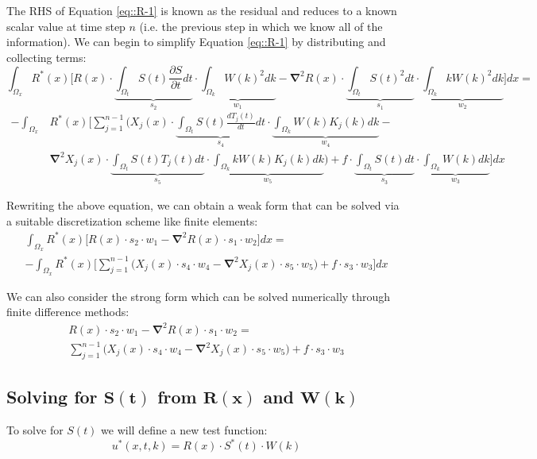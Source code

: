 \documentclass{article}
\def\ds{\displaystyle}
\def\pd{\partial}
\def\grad{\mathbf\nabla}
\begin{document}
The RHS of Equation \ref{eq::R-1} is known as the residual and reduces to a known scalar value at time step $n$ (i.e. the previous step in which we know all of the information). We can begin to simplify Equation \ref{eq::R-1} by distributing and collecting terms:
\begin{equation*}
\ds\int_{\Omega_x} R^*(x) \Bigg[ R(x)\cdot \underbrace{\ds\int_{\Omega_t} S(t)\frac{\pd S}{\pd t}dt}_{s_2} \cdot \underbrace{\ds\int_{\Omega_k} W(k)^2 dk}_{w_1} - \grad^2 R(x) \cdot \underbrace{\ds\int_{\Omega_t} S(t)^2 dt}_{s_1} \cdot \underbrace{\ds\int_{\Omega_k} kW(k)^2 dk}_{w_2} \Bigg] dx =
\end{equation*}\vspace{-15pt}
\begin{align}
-\ds\int_{\Omega_x}& R^*(x) \Bigg[ \ds\sum_{j=1}^{n-1} \bigg(X_j(x) \cdot \underbrace{\ds\int_{\Omega_t} S(t)\frac{dT_j(t)}{dt} dt}_{s_4} \cdot \underbrace{\ds\int_{\Omega_k}W(k)K_j(k) dk}_{w_4} - \nonumber \\
& \grad^2X_j(x) \cdot \underbrace{\ds\int_{\Omega_t}S(t)T_j(t) dt}_{s_5} \cdot \underbrace{\ds\int_{\Omega_k}kW(k)K_j(k)dk}_{w_5} \bigg) + f \cdot \underbrace{\ds\int_{\Omega_t} S(t) dt}_{s_3} \cdot \underbrace{\ds\int_{\Omega_k} W(k)dk}_{w_3} \Bigg] dx
\end{align}

Rewriting the above equation, we can obtain a weak form that can be solved via a suitable discretization scheme like finite elements:
\begin{gather}
\ds\int_{\Omega_x} R^*(x) \Bigg[ R(x)\cdot s_2 \cdot w_1 - \grad^2 R(x) \cdot s_1 \cdot w_2 \Bigg] dx = \nonumber \\
 -  \ds\int_{\Omega_x} R^*(x) \Bigg[ \ds\sum_{j=1}^{n-1} \bigg(X_j(x) \cdot s_4 \cdot w_4 - \grad^2X_j(x) \cdot s_5 \cdot w_5 \bigg) + f \cdot s_3 \cdot w_3 \Bigg] dx
\end{gather}

We can also consider the strong form which can be solved numerically through finite difference methods:
\begin{gather}
\label{eq::R-strong}
R(x)\cdot s_2 \cdot w_1 - \grad^2 R(x) \cdot s_1 \cdot w_2 =  \nonumber \\
\ds\sum_{j=1}^{n-1} \bigg(X_j(x) \cdot s_4 \cdot w_4 - \grad^2X_j(x) \cdot s_5 \cdot w_5 \bigg) + f \cdot s_3 \cdot w_3
\end{gather}

\subsection{Solving for $\mathbf{S(t)}$ from $\mathbf{R(x)}$ and $\mathbf{W(k)}$}
To solve for $S(t)$ we will define a new test function:
\begin{equation}
\label{eq::R-TestFctn-2}
u^*(x,t,k) = R(x) \cdot S^*(t) \cdot W(k)
\end{equation}
\end{document}
